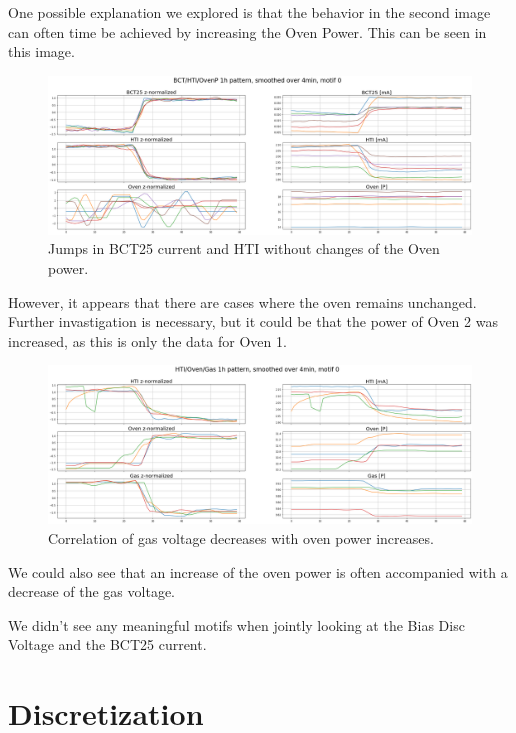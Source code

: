 \documentclass[12pt,a4paper]{article}
\begin{document}
One possible explanation we explored is that the behavior in the second
image can often time be achieved by increasing the Oven Power. This can
be seen in this image.

\begin{figure}
\centering
\includegraphics{images/bct_oven_hti_2dim.png}
\caption{Jumps in BCT25 current and HTI without changes of the Oven
power.}
\end{figure}

However, it appears that there are cases where the oven remains
unchanged. Further invastigation is necessary, but it could be that the
power of Oven 2 was increased, as this is only the data for Oven 1.

\begin{figure}
\centering
\includegraphics{images/gas_oven_hti.png}
\caption{Correlation of gas voltage decreases with oven power
increases.}
\end{figure}

We could also see that an increase of the oven power is often
accompanied with a decrease of the gas voltage.

We didn't see any meaningful motifs when jointly looking at the Bias
Disc Voltage and the BCT25 current.

\hypertarget{discretization}{%
\section{Discretization}\label{discretization}}
\end{document}

